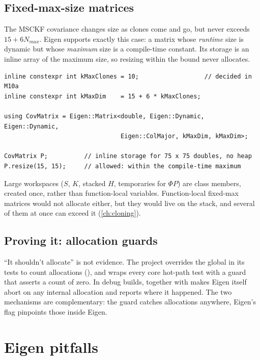 \subsection{Fixed-max-size matrices}

The MSCKF covariance changes size as clones come and go, but never exceeds $15 + 6N_{max}$. Eigen supports exactly this case: a
matrix whose \emph{runtime} size is dynamic but whose \emph{maximum} size is a compile-time constant. Its storage is an inline array of the
maximum size, so resizing within the bound never allocates.

\begin{lstlisting}
inline constexpr int kMaxClones = 10;                  // decided in M10a
inline constexpr int kMaxDim    = 15 + 6 * kMaxClones;

using CovMatrix = Eigen::Matrix<double, Eigen::Dynamic, Eigen::Dynamic,
                                Eigen::ColMajor, kMaxDim, kMaxDim>;

CovMatrix P;          // inline storage for 75 x 75 doubles, no heap
P.resize(15, 15);     // allowed: within the compile-time maximum
\end{lstlisting}

Large workspaces ($S$, $K$, stacked $H$, temporaries for $\Phi P$) are class members, created once, rather than function-local
variables. Function-local fixed-max matrices would not allocate either, but they would live on the stack, and several of them at
once can exceed it (\cref{ch:cloning}).

\subsection{Proving it: allocation guards}

``It shouldn't allocate'' is not evidence. The project overrides the global  in its tests to count allocations
(), and wraps every core hot-path test with a guard that asserts a count of zero. In debug builds,
 together with  makes Eigen itself abort on any internal
allocation and reports where it happened. The two mechanisms are complementary: the guard catches allocations anywhere, Eigen's flag
pinpoints those inside Eigen.

\section{Eigen pitfalls}

